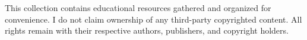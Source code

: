 \documentclass[preview]{standalone}
\begin{document}
\flushleft
\begin{minipage}{0.41\textwidth}
            This collection contains educational resources gathered and organized
            for convenience. I do not claim ownership of any third-party copyrighted
            content. All rights remain with their respective authors, publishers,
            and copyright holders.
            \end{minipage}
\end{document}
